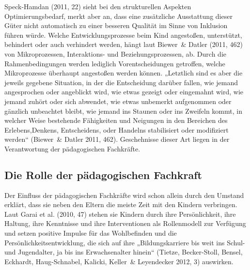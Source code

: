 Speck-Hamdan (2011, 22) sieht bei den strukturellen Aspekten Optimierungsbedarf, merkt aber an, dass eine zusätzliche Ausstattung dieser Güter nicht automatisch zu einer besseren Qualität im Sinne von Inklusion führen würde. Welche Entwicklungsprozesse beim Kind angestoßen, unterstützt, behindert oder auch verhindert werden, hängt laut Biewer~\& Datler (2011, 462) von Mikroprozessen, Interaktions- und Beziehungsprozessen, ab. Durch die Rahmenbedingungen werden lediglich Vorentscheidungen getroffen, welche Mikroprozesse überhaupt angestoßen werden können. „Letztlich sind es aber die jeweils gegebene Situation, in der die Entscheidung darüber fallen, wie jemand angesprochen oder angeblickt wird, wie etwas gezeigt oder eingemahnt wird, wie jemand zuhört oder sich abwendet, wie etwas unbemerkt aufgenommen oder gänzlich unbeachtet bleibt, wie jemand ins Staunen oder ins Zweifeln kommt, in welcher Weise bestehende Fähigkeiten und Neigungen in den Bereichen des Erlebens,Denkens, Entscheidens, oder Handelns stabilisiert oder modifiziert werden“ (Biewer~\& Datler 2011, 462). Geschehnisse dieser Art liegen in der Verantwortung der pädagogischen Fachkräfte.  

\subsection{Die Rolle der pädagogischen Fachkraft}

Der Einfluss der pädagogischen Fachkräfte wird schon allein durch den Umstand erklärt, dass sie neben den Eltern die meiste Zeit mit den Kindern verbringen. Laut Garai et al. (2010, 47) stehen sie Kindern durch ihre Persönlichkeit, ihre Haltung, ihre Kenntnisse und ihre Interventionen als Rollenmodell zur Verfügung und setzen positive Impulse für das Wohlbefinden und die Persönlichkeitsentwicklung, die sich auf ihre „Bildungskarriere bis weit ins Schul- und Jugendalter, ja bis ins Erwachsenalter hinein“ (Tietze, Becker-Stoll, Bensel, Eckhardt, Haug-Schnabel, Kalicki, Keller~\& Leyendecker 2012, 3) auswirken.  
 
